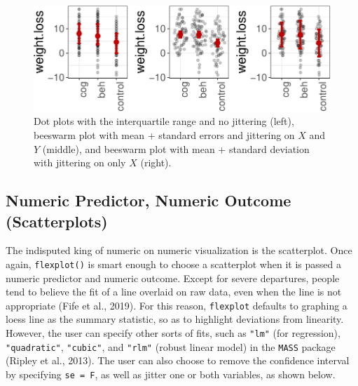 \documentclass[
  man]{apa6}
\begin{document}
\begin{figure}

{\centering \includegraphics[width=0.9\linewidth]{flexplot_psychmeth_files/figure-latex/jitterit-1} 

}

\caption{Dot plots with the interquartile range and no jittering (left), beeswarm plot with mean + standard errors and jittering on $X$ and $Y$ (middle), and beeswarm plot with mean + standard deviation with jittering on only $X$ (right).}\label{fig:jitterit}
\end{figure}

\hypertarget{numeric-predictor-numeric-outcome-scatterplots}{%
\subsection{Numeric Predictor, Numeric Outcome (Scatterplots)}\label{numeric-predictor-numeric-outcome-scatterplots}}

The indisputed king of numeric on numeric visualization is the scatterplot. Once again, \texttt{flexplot()} is smart enough to choose a scatterplot when it is passed a numeric predictor and numeric outcome. Except for severe departures, people tend to believe the fit of a line overlaid on raw data, even when the line is not appropriate (Fife et al., 2019). For this reason, \texttt{flexplot} defaults to graphing a loess line as the summary statistic, so as to highlight deviations from linearity. However, the user can specify other sorts of fits, such as \texttt{"lm"} (for regression), \texttt{"quadratic"}, \texttt{"cubic"}, and \texttt{"rlm"} (robust linear model) in the \texttt{MASS} package (Ripley et al., 2013). The user can also choose to remove the confidence interval by specifying \texttt{se\ =\ F}, as well as jitter one or both variables, as shown below.
\end{document}
